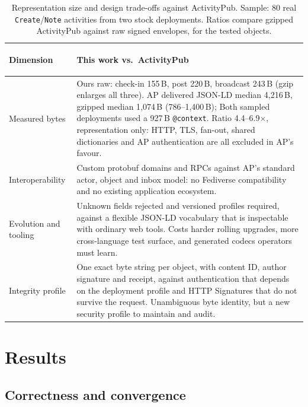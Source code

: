 \documentclass[conference,a4paper,10pt]{IEEEtran}
\begin{document}
\begin{table}[!t]
  \caption{Representation size and design trade-offs against ActivityPub. Sample: 80 real
    \texttt{Create}/\texttt{Note} activities from two stock deployments. Ratios compare gzipped
    ActivityPub against raw signed envelopes, for the tested objects.}
  \label{tab:tradeoff}
  \centering
  \normalsize
  \begin{tabularx}{\textwidth}{@{}>{\bfseries\raggedright\arraybackslash}p{25mm}>{\raggedright\arraybackslash}X@{}}
    \toprule
    Dimension & This work vs.\ ActivityPub \\
    \midrule
    Measured bytes & Ours raw: check-in 155\,B, post 220\,B, broadcast 243\,B (gzip enlarges all
    three). AP delivered JSON-LD median 4{,}216\,B, gzipped median 1{,}074\,B (786--1{,}400\,B);
    Both sampled deployments used a 927\,B \texttt{@context}. Ratio 4.4--6.9$\times$, representation only: HTTP, TLS,
    fan-out, shared dictionaries and AP authentication are all excluded in AP's favour. \\
    \addlinespace[2pt]
    Interoperability & Custom protobuf domains and RPCs against AP's standard actor, object and
    inbox model: no Fediverse compatibility and no existing application ecosystem. \\
    \addlinespace[2pt]
    Evolution and tooling & Unknown fields rejected and versioned profiles required, against a
    flexible JSON-LD vocabulary that is inspectable with ordinary web tools. Costs harder rolling
    upgrades, more cross-language test surface, and generated codecs operators must learn. \\
    \addlinespace[2pt]
    Integrity profile & One exact byte string per object, with content ID, author signature and
    receipt, against authentication that depends on the deployment profile and HTTP Signatures that
    do not survive the request. Unambiguous byte identity, but a new security profile to maintain
    and audit. \\
    \bottomrule
  \end{tabularx}
\end{table}

\section{Results}
\label{sec:results}

\subsection{Correctness and convergence}
\end{document}

